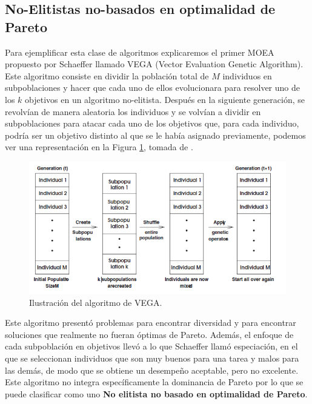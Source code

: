 \subsection*{No-Elitistas no-basados en optimalidad de Pareto} \label{sec:VEGA}

Para ejemplificar esta clase de algoritmos explicaremos el primer MOEA propuesto por Schaeffer \cite{schafferMultipleObjectiveOptimization1984} llamado VEGA (Vector Evaluation Genetic Algorithm). Este algoritmo consiste en dividir la población total de $M$ individuos en subpoblaciones y hacer que cada uno de ellos evolucionara para resolver uno de los $k$ objetivos en un algoritmo no-elitista. Después en la siguiente generación, se revolvían de manera aleatoria los individuos y se volvían a dividir en subpoblaciones para atacar cada uno de los objetivos que, para cada individuo, podría ser un objetivo distinto al que se le había asignado previamente, podemos ver una representación en la Figura \ref{fig:VEGA}, tomada de \cite{coelloEvolutionaryAlgorithmsSolving}.

\begin{figure}[H]
    \centering
    \includegraphics[width=\textwidth]{Figuras/vega.png}
    \caption[VEGA]{Ilustración del algoritmo de VEGA.}
    \label{fig:VEGA}
\end{figure}

Este algoritmo presentó problemas para encontrar diversidad y para encontrar soluciones que realmente no fueran óptimas de Pareto. Además, el enfoque de cada subpoblación en objetivos llevó a lo que Schaeffer llamó especiación, en el que se seleccionan individuos que son muy buenos para una tarea y malos para las demás, de modo que se obtiene un desempeño aceptable, pero no excelente. Este algoritmo no integra específicamente la dominancia de Pareto por lo que se puede clasificar como uno \textbf{No elitista no basado en optimalidad de Pareto}.

